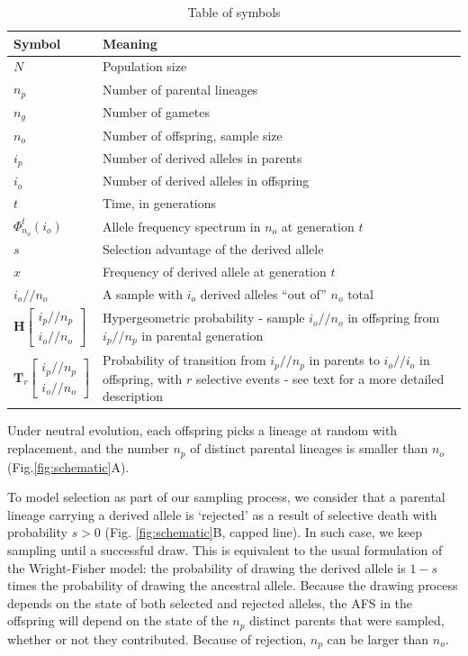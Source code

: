 \documentclass[review]{elsarticle}
\newcommand{\dslash}{/\!\!/}
\newcommand{\Coalc}[4]{\begin{bmatrix}#1\dslash #2 \\ #3\dslash #4 \end{bmatrix}}
\begin{document}
\begin{table}
  \centering
  \begin{tabular}{l|p{100mm}}
    Symbol & Meaning\\
    \hline
    $N$ & Population size\\
    $n_p$ & Number of parental lineages\\
    $n_g$ & Number of gametes\\
    $n_o$ & Number of offspring, sample size\\
    $i_p$ & Number of derived alleles in parents\\
    $i_o$ & Number of derived alleles in offspring\\
    $t$ & Time, in generations\\
    $\Phi_{n_o}^{t}(i_o)$ & Allele frequency spectrum in $n_o$ at generation $t$\\
    $s$ & Selection advantage of the derived allele\\
    $x$ & Frequency of derived allele at generation $t$\\
    $i_o \dslash n_o$ & A sample with $i_o$ derived alleles ``out of'' $n_o$ total\\
    $\mathbf{H}\Coalc{i_p}{n_p}{i_o}{n_o}$ & Hypergeometric probability -
                                             sample $i_o \dslash n_o$ in offspring from $i_p \dslash n_p$ in parental generation\\
    $\mathbf{T}_{r}\Coalc{i_p}{n_p}{i_o}{n_o}$ & Probability of transition from $i_p \dslash n_p$ in parents
                                                 to $i_o \dslash i_o$ in offspring, with $r$ selective events -
                                                 see text for a more detailed description\\
  \end{tabular}
  \caption{\label{tab:symbols} Table of symbols}
\end{table}

Under neutral evolution, each offspring picks a lineage at random with replacement, and the number $n_p$ of distinct parental lineages is smaller than
$n_o$  (Fig.\ref{fig:schematic}A). 


To model selection as part of our sampling process, we consider that a parental lineage carrying a derived allele 
is `rejected' as a result of selective death with probability $s>0$
(Fig. \ref{fig:schematic}B, capped line). In such case, we keep sampling until a successful draw.  
This is equivalent to the usual formulation of the Wright-Fisher model: the probability of drawing 
the derived allele is $1-s$ times the probability of drawing the ancestral allele. 
Because the drawing process depends on the state of both selected and rejected alleles, 
the AFS in the offspring will depend on the state of the $n_p$ distinct parents that were sampled,
whether or not they contributed. Because of rejection, $n_p$ can be larger than $n_o.$
\end{document}
